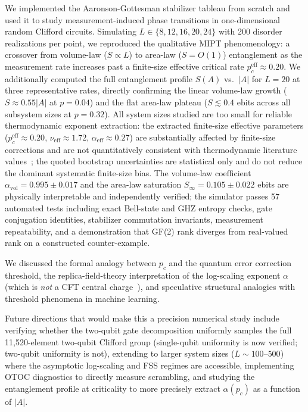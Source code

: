 \documentclass[twocolumn,prl,aps,floatfix]{revtex4-2}
\begin{document}
We implemented the Aaronson-Gottesman stabilizer tableau from scratch and used it
to study measurement-induced phase transitions in one-dimensional random Clifford
circuits.
Simulating $L \in \{8, 12, 16, 20, 24\}$ with 200 disorder realizations per point,
we reproduced the qualitative MIPT phenomenology:
a crossover from volume-law ($S \propto L$) to area-law ($S = O(1)$) entanglement
as the measurement rate increases past a finite-size effective critical rate
$p_c^{\mathrm{eff}} \approx 0.20$.
We additionally computed the full entanglement profile $S(A)$ vs.\ $|A|$ for
$L = 20$ at three representative rates, directly confirming the linear
volume-law growth ($S \approx 0.55|A|$ at $p = 0.04$) and the flat area-law
plateau ($S \lesssim 0.4$ ebits across all subsystem sizes at $p = 0.32$).
All system sizes studied are too small for reliable thermodynamic exponent
extraction: the extracted finite-size effective parameters
($p_c^{\mathrm{eff}} \approx 0.20$, $\nu_{\mathrm{eff}} \approx 1.72$,
$\alpha_{\mathrm{eff}} \approx 0.27$) are substantially affected by finite-size
corrections and are not quantitatively consistent with thermodynamic literature
values~\cite{Li2019,Zabalo2020}; the quoted bootstrap uncertainties are
statistical only and do not reduce the dominant systematic finite-size bias.
The volume-law coefficient $\alpha_{\mathrm{vol}} = 0.995 \pm 0.017$ and the
area-law saturation $S_\infty = 0.105 \pm 0.022$ ebits are physically
interpretable and independently verified; the simulator passes 57 automated
tests including exact Bell-state and GHZ entropy checks, gate conjugation
identities, stabilizer commutation invariants, measurement repeatability,
and a demonstration that GF(2) rank diverges from real-valued rank on a
constructed counter-example.

We discussed the formal analogy between $p_c$ and the quantum error correction
threshold, the replica-field-theory interpretation of the log-scaling exponent
$\alpha$ (which is \textit{not} a CFT central charge~\cite{Jian2020}), and
speculative structural analogies with threshold phenomena in machine learning.

Future directions that would make this a precision numerical study include
verifying whether the two-qubit gate decomposition uniformly samples the
full 11,520-element two-qubit Clifford group
(single-qubit uniformity is now verified; two-qubit uniformity is not),
extending to larger system sizes ($L \sim 100$--$500$) where the asymptotic
log-scaling and FSS regimes are accessible, implementing OTOC diagnostics
to directly measure scrambling, and studying the entanglement profile at
criticality to more precisely extract $\alpha(p_c)$ as a function of $|A|$.
\end{document}
